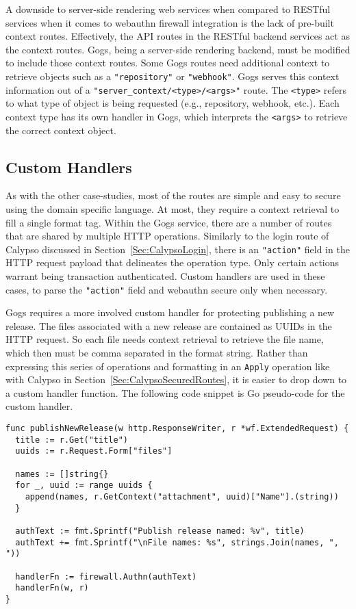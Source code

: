 A downside to server-side rendering web services when compared to RESTful services when it comes to webauthn firewall integration is the lack of pre-built context routes. Effectively, the API routes in the RESTful backend services act as the context routes. Gogs, being a server-side rendering backend, must be modified to include those context routes. Some Gogs routes need additional context to retrieve objects such as a \lstinline{"repository"} or \lstinline{"webhook"}. Gogs serves this context information out of a \lstinline{"server_context/<type>/<args>"} route. The \lstinline{<type>} refers to what type of object is being requested (e.g., repository, webhook, etc.). Each context type has its own handler in Gogs, which interprets the \lstinline{<args>} to retrieve the correct context object.


\subsection{Custom Handlers}\label{Sec:Gogs_CustomHandlers}

As with the other case-studies, most of the routes are simple and easy to secure using the domain specific language. At most, they require a context retrieval to fill a single format tag. Within the Gogs service, there are a number of routes that are shared by multiple HTTP operations. Similarly to the login route of Calypso discussed in Section~\ref{Sec:CalypsoLogin}, there is an \lstinline{"action"} field in the HTTP request payload that delineates the operation type. Only certain actions warrant being transaction authenticated. Custom handlers are used in these cases, to parse the \lstinline{"action"} field and webauthn secure only when necessary.

Gogs requires a more involved custom handler for protecting publishing a new release. The files associated with a new release are contained as UUIDs in the HTTP request. So each file needs context retrieval to retrieve the file name, which then must be comma separated in the format string. Rather than expressing this series of operations and formatting in an \lstinline{Apply} operation like with Calypso in Section~\ref{Sec:CalypsoSecuredRoutes}, it is easier to drop down to a custom handler function. The following code snippet is Go pseudo-code for the custom handler.

\begin{lstlisting}[float=h]
func publishNewRelease(w http.ResponseWriter, r *wf.ExtendedRequest) {
  title := r.Get("title")
  uuids := r.Request.Form["files"]

  names := []string{}
  for _, uuid := range uuids {
    append(names, r.GetContext("attachment", uuid)["Name"].(string))
  }

  authText := fmt.Sprintf("Publish release named: %v", title)
  authText += fmt.Sprintf("\nFile names: %s", strings.Join(names, ", "))

  handlerFn := firewall.Authn(authText)
  handlerFn(w, r)
}
\end{lstlisting}


